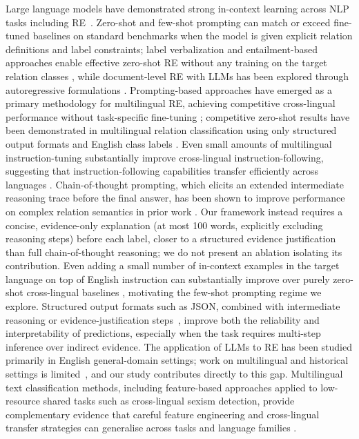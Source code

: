 \documentclass[
]{ceurart}
\theoremstyle{definition}
\begin{document}
Large language models have demonstrated strong in-context learning across NLP tasks including RE~\citep{brown2020language,wadhwa2023revisiting,achiam2023gpt}.
Zero-shot and few-shot prompting can match or exceed fine-tuned baselines on standard benchmarks when the model is given explicit relation definitions and label constraints; label verbalization and entailment-based approaches enable effective zero-shot RE without any training on the target relation classes \citep{sainz-etal-2021-label}, while document-level RE with LLMs has been explored through autoregressive formulations \citep{xue2024autore}.
Prompting-based approaches have emerged as a primary methodology for multilingual RE, achieving competitive cross-lingual performance without task-specific fine-tuning \citep{ali2025multilingual}; competitive zero-shot results have been demonstrated in multilingual relation classification using only structured output formats and English class labels \citep{cabot2023redfm}.
Even small amounts of multilingual instruction-tuning substantially improve cross-lingual instruction-following, suggesting that instruction-following capabilities transfer efficiently across languages \citep{shaham-etal-2024-multilingual}.
Chain-of-thought prompting, which elicits an extended intermediate reasoning trace before the final answer, has been shown to improve performance on complex relation semantics in prior work \citep{wadhwa2023revisiting}. Our framework instead requires a concise, evidence-only explanation (at most 100 words, explicitly excluding reasoning steps) before each label, closer to a structured evidence justification than full chain-of-thought reasoning; we do not present an ablation isolating its contribution.
Even adding a small number of in-context examples in the target language on top of English instruction can substantially improve over purely zero-shot cross-lingual baselines \citep{hennig2023multitacred}, motivating the few-shot prompting regime we explore.
Structured output formats such as JSON, combined with intermediate reasoning or evidence-justification steps~\citep{wei2022chain}, improve both the reliability and interpretability of predictions, especially when the task requires multi-step inference over indirect evidence.
The application of LLMs to RE has been studied primarily in English general-domain settings; work on multilingual and historical settings is limited~\citep{Jinensibieke2024HowGA,swarup-etal-2025-llm4re,keinan2023jct,keinan2024text}, and our study contributes directly to this gap.
Multilingual text classification methods, including feature-based approaches applied to low-resource shared tasks such as cross-lingual sexism detection, provide complementary evidence that careful feature engineering and cross-lingual transfer strategies can generalise across tasks and language families \citep{keinan2024sexism,keinan2024tackling}.
\end{document}
